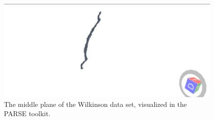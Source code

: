\begin{figure}[h]
\begin{center}
\includegraphics[scale=0.4]{./testing/wilko3} 
\end{center}
\caption{The middle plane of the Wilkinson data set, visualized in the PARSE toolkit.}
\label{fig:The middle plane of the wilkinson data set, visualized in the parse toolkit.}
\end{figure}